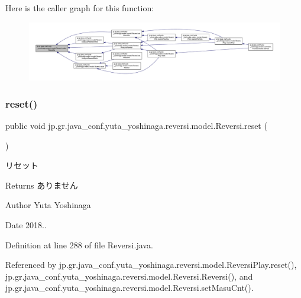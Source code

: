 Here is the caller graph for this function\+:
\nopagebreak
\begin{figure}[H]
\begin{center}
\leavevmode
\includegraphics[width=350pt]{classjp_1_1gr_1_1java__conf_1_1yuta__yoshinaga_1_1reversi_1_1model_1_1_reversi_a9929ed36140ddc25923ede99f86564c3_icgraph}
\end{center}
\end{figure}
\mbox{\label{classjp_1_1gr_1_1java__conf_1_1yuta__yoshinaga_1_1reversi_1_1model_1_1_reversi_a497552844cbae36207f2d8c836a26b8e}} 
\subsubsection{\texorpdfstring{reset()}{reset()}}
{\footnotesize\ttfamily public void jp.\+gr.\+java\+\_\+conf.\+yuta\+\_\+yoshinaga.\+reversi.\+model.\+Reversi.\+reset (\begin{DoxyParamCaption}{ }\end{DoxyParamCaption})}



リセット 

\begin{DoxyReturn}{Returns}
ありません 
\end{DoxyReturn}
\begin{DoxyAuthor}{Author}
Yuta Yoshinaga 
\end{DoxyAuthor}
\begin{DoxyDate}{Date}
2018.. 
\end{DoxyDate}


Definition at line 288 of file Reversi.\+java.



Referenced by jp.\+gr.\+java\+\_\+conf.\+yuta\+\_\+yoshinaga.\+reversi.\+model.\+Reversi\+Play.\+reset(), jp.\+gr.\+java\+\_\+conf.\+yuta\+\_\+yoshinaga.\+reversi.\+model.\+Reversi.\+Reversi(), and jp.\+gr.\+java\+\_\+conf.\+yuta\+\_\+yoshinaga.\+reversi.\+model.\+Reversi.\+set\+Masu\+Cnt().

